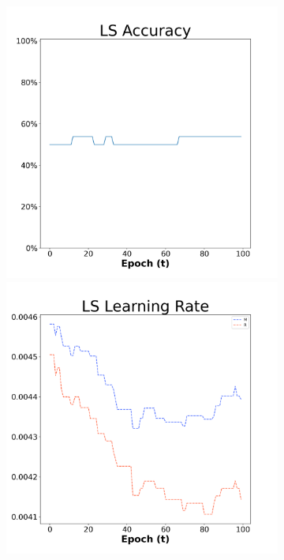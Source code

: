 \begin{figure}[H]
    \centering %
\begin{subfigure}{0.3\textwidth}
  \includegraphics[width=\linewidth]{images/exper1/Sonar/LS_0.01_acc.png}
    \includegraphics[width=\linewidth]{images/exper1/Sonar/LS_0.01_lr.png}

\end{subfigure}
\end{figure}
